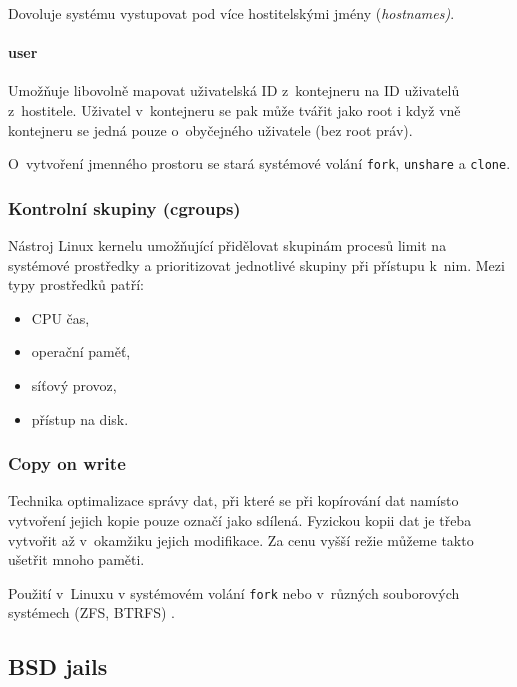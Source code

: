 Dovoluje systému vystupovat pod více hostitelskými jmény (\textit{hostnames)}.
\cite{namespaces}

\paragraph{user}

Umožňuje libovolně mapovat uživatelská ID z~kontejneru na ID uživatelů z~hostitele.
Uživatel v~kontejneru se pak může tvářit jako root i když vně kontejneru se jedná pouze o~obyčejného uživatele (bez root práv).
\cite{user_namespaces}


O~vytvoření jmenného prostoru se stará systémové volání \verb|fork|, \verb|unshare| a \verb|clone|.

\subsubsection{Kontrolní skupiny (cgroups)}

Nástroj Linux kernelu umožňující přidělovat skupinám procesů limit na systémové prostředky a prioritizovat jednotlivé skupiny při přístupu k~nim.
Mezi typy prostředků patří:

\begin{itemize}
	\item CPU čas,
	\item operační paměť,
	\item síťový provoz,
	\item přístup na disk.
\end{itemize} %

\subsubsection{Copy on write}


Technika optimalizace správy dat, při které se při kopírování dat namísto vytvoření jejich kopie pouze označí jako sdílená.
Fyzickou kopii dat je třeba vytvořit až v~okamžiku jejich modifikace.
Za cenu vyšší režie můžeme takto ušetřit mnoho paměti.
\cite{copy_on_write}

Použití v~Linuxu v systémovém volání \verb|fork| \cite{fork_manual} nebo v~různých souborových systémech (ZFS, BTRFS) \cite{fs_cow}.

\subsection{BSD jails}

